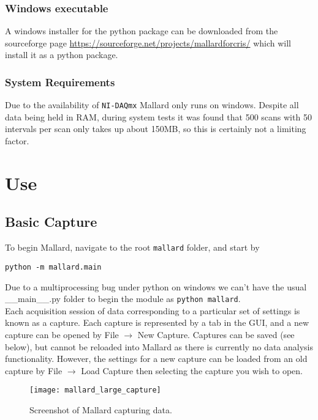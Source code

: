 \documentclass[10pt,a4paper]{article}
\begin{document}
\subsubsection{Windows executable}
A windows installer for the python package can be downloaded from the sourceforge page \url{https://sourceforge.net/projects/mallardforcris/} which will install it as a python package.

\subsubsection{System Requirements}
Due to the availability of \texttt{NI-DAQmx} Mallard only runs on windows. Despite all data being held in RAM, during system tests it was found that 500 scans with 50 intervals per scan only takes up about 150MB, so this is certainly not a limiting factor.

\section{Use}
\subsection{Basic Capture}
To begin Mallard, navigate to the root \texttt{mallard} folder, and start by
\begin{verbatim}
python -m mallard.main
\end{verbatim}
Due to a multiprocessing bug under python on windows we can't have the usual \_\_main\_\_.py folder to begin the module as \texttt{python mallard}. \\

Each acquisition session of data corresponding to a particular set of settings is known as a capture. Each capture is represented by a tab in the GUI, and a new capture can be opened by File $\rightarrow$ New Capture. Captures can be saved (see below), but cannot be reloaded into Mallard as there is currently no data analysis functionality. However, the settings for a new capture can be loaded from an old capture by File $\rightarrow$ Load Capture then selecting the capture you wish to open.\\

\begin{figure}[h!]

  \centering
    \texttt{[image: mallard\_large\_capture]}
      \caption{Screenshot of Mallard capturing data.}
\end{figure}
\end{document}
